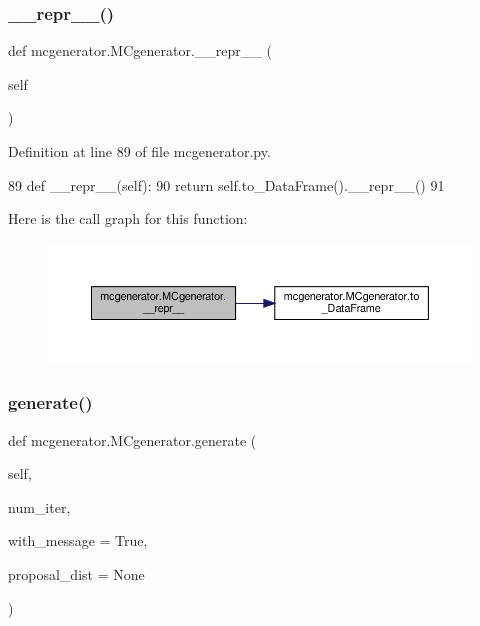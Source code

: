 \subsubsection{\texorpdfstring{\+\_\+\+\_\+repr\+\_\+\+\_\+()}{\_\_repr\_\_()}}
{\footnotesize\ttfamily def mcgenerator.\+M\+Cgenerator.\+\_\+\+\_\+repr\+\_\+\+\_\+ (\begin{DoxyParamCaption}\item[{}]{self }\end{DoxyParamCaption})}



Definition at line 89 of file mcgenerator.\+py.


\begin{DoxyCode}
89     \textcolor{keyword}{def }\_\_repr\_\_(self):
90         \textcolor{keywordflow}{return} self.to\_DataFrame().\_\_repr\_\_()
91 
\end{DoxyCode}
Here is the call graph for this function\+:\nopagebreak
\begin{figure}[H]
\begin{center}
\leavevmode
\includegraphics[width=350pt]{d3/dad/classmcgenerator_1_1MCgenerator_a242f49dce70773d317ffde2988c92c66_cgraph}
\end{center}
\end{figure}
\mbox{\label{classmcgenerator_1_1MCgenerator_a660b1c6c2600d3cefc77690838c755b5}} 
\subsubsection{\texorpdfstring{generate()}{generate()}}
{\footnotesize\ttfamily def mcgenerator.\+M\+Cgenerator.\+generate (\begin{DoxyParamCaption}\item[{}]{self,  }\item[{}]{num\+\_\+iter,  }\item[{}]{with\+\_\+message = {\ttfamily True},  }\item[{}]{proposal\+\_\+dist = {\ttfamily None} }\end{DoxyParamCaption})}

